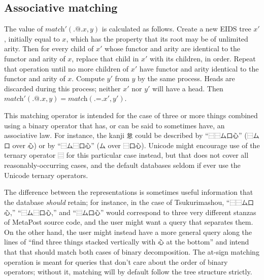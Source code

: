\documentclass[twocolumn]{report}
\begin{document}
\subsection{Associative matching}

The value of $\textit{match}'(\texttt{.@.}x,y)$ is calculated as follows. 
Create a new EIDS tree $x'$, initially equal to $x$, which has the property
that its root may be of unlimited arity.  Then for every child of $x'$ whose
functor and arity are identical to the functor and arity of $x$, replace
that child in $x'$ with its children, in order.  Repeat that operation until
no more children of $x'$ have functor and arity identical to the
functor and arity of $x$.  Compute $y'$ from $y$ by the same process.
Heads are discarded during this process; neither $x'$ nor $y'$ will
have a head.  Then
$\textit{match}'(\texttt{.@.}x,y)=\textit{match}(\texttt{.=.}x',y')$.

This matching operator is intended for the case of three or more
things combined using a binary operator that has, or can be said to sometimes
have, an associative law.  For instance, the kanji \texttt{怠} could be
described by ``\texttt{⿱⿱厶口心}'' (\texttt{⿱厶口} over \texttt{心}) or
by ``\texttt{⿱厶⿱口心}'' (\texttt{厶} over \texttt{⿱口心}).  Unicode
might encourage use of the ternary operator \texttt{⿳} for this particular
case instead, but that does not cover all reasonably-occurring cases, and
the default databases seldom if ever use the Unicode ternary operators.

The difference between the representations is sometimes useful information
that the database \emph{should} retain; for instance, in the case of
Tsukurimashou, ``\texttt{⿱⿱厶口心},'' ``\texttt{⿱厶⿱口心},'' and
``\texttt{⿳厶口心}'' would correspond to three very different
stanzas of MetaPost source code, and the user might want a query
that separates them.  On the other hand, the user might instead have a more
general query along the lines of ``find three things stacked vertically with
\texttt{心} at the bottom'' and intend that that should match both cases of
binary decomposition.  The at-sign matching operation is meant for queries
that don't care about the order of binary operators; without it, matching
will by default follow the tree structure strictly.
\end{document}
